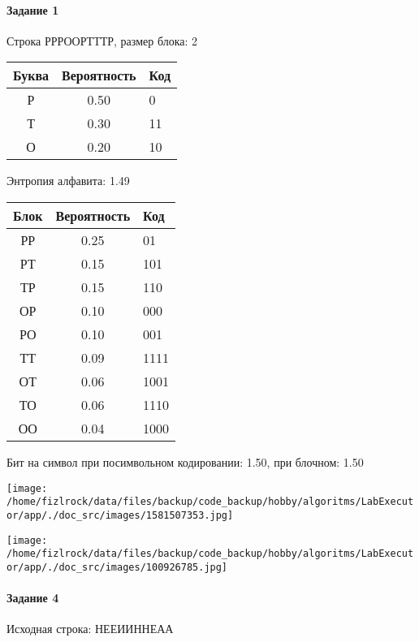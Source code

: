 \documentclass[a4paper, 12pt]{article}
\begin{document}
\paragraph{Задание 1}

Строка РРРООРТТТР, размер блока: 2
\begin{center}
 \begin{tabular}{ |c|c|l| } 
  \hline
     Буква & Вероятность & Код\\ \hline
Р & 0.50 & 0\\\hline
Т & 0.30 & 11\\\hline
О & 0.20 & 10
\\ \hline \end{tabular}
\end{center}
Энтропия алфавита: 1.49
\begin{center}
 \begin{tabular}{ |c|c|l| } 
  \hline
     Блок & Вероятность & Код\\ \hline
РР & 0.25 & 01\\\hline
РТ & 0.15 & 101\\\hline
ТР & 0.15 & 110\\\hline
ОР & 0.10 & 000\\\hline
РО & 0.10 & 001\\\hline
ТТ & 0.09 & 1111\\\hline
ОТ & 0.06 & 1001\\\hline
ТО & 0.06 & 1110\\\hline
ОО & 0.04 & 1000
\\ \hline \end{tabular}
\end{center}
Бит на символ при посимвольном кодировании: 1.50, при блочном: 1.50

\texttt{[image: /home/fizlrock/data/files/backup/code\_backup/hobby/algoritms/LabExecutor/app/./doc\_src/images/1581507353.jpg]}

\texttt{[image: /home/fizlrock/data/files/backup/code\_backup/hobby/algoritms/LabExecutor/app/./doc\_src/images/100926785.jpg]}
\paragraph{Задание 4}


Исходная строка: НЕЕИИННЕАА
\end{document}
